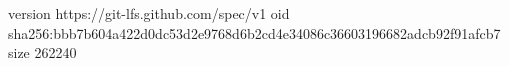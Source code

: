 version https://git-lfs.github.com/spec/v1
oid sha256:bbb7b604a422d0dc53d2e9768d6b2cd4e34086c36603196682adcb92f91afcb7
size 262240
